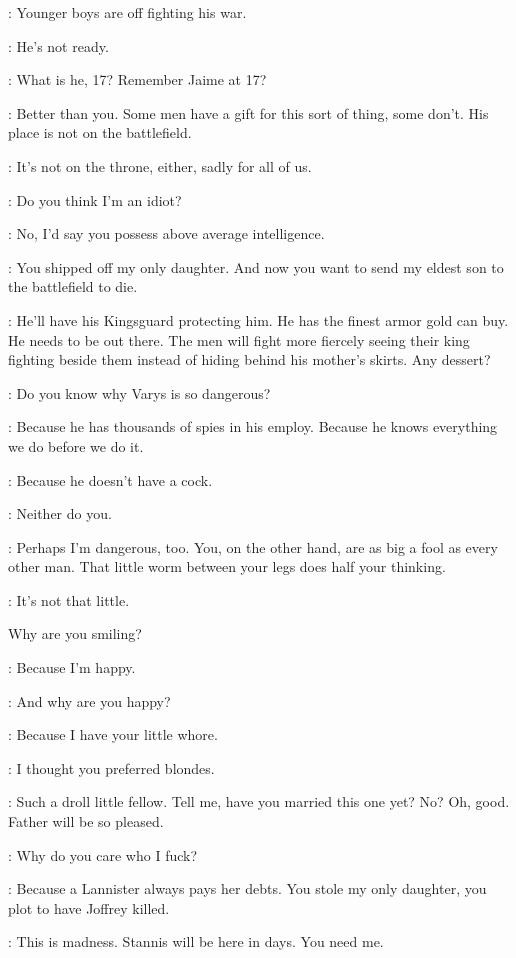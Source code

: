 \TYRION: Younger boys are off fighting his war. 

\CERSEI: He's not ready. 

\TYRION: What is he, 17? Remember Jaime at 17? 

\CERSEI: Better than you. Some men have a gift for this sort of thing, some don't. His place is not on the battlefield. 

\TYRION: It's not on the throne, either, sadly for all of us. 

\CERSEI: Do you think I'm an idiot? 

\TYRION: No, I'd say you possess above average intelligence. 

\CERSEI: You shipped off my only daughter. And now you want to send my eldest son to the battlefield to die. 

\TYRION: He'll have his Kingsguard protecting him. He has the finest armor gold can buy. He needs to be out there. The men will fight more fiercely seeing their king fighting beside them instead of hiding behind his mother's skirts. Any dessert? 

\CERSEI: Do you know why Varys is so dangerous? 

\TYRION: Because he has thousands of spies in his employ. Because he knows everything we do before we do it. 

\CERSEI: Because he doesn't have a cock. 

\TYRION: Neither do you. 

\CERSEI: Perhaps I'm dangerous, too. You, on the other hand, are as big a fool as every other man. That little worm between your legs does half your thinking. 

\TYRION: It's not that little. 

Why are you smiling? 

\CERSEI: Because I'm happy. 

\TYRION: And why are you happy? 

\CERSEI: Because I have your little whore. 

\TYRION: I thought you preferred blondes. 

\CERSEI: Such a droll little fellow. Tell me, have you married this one yet? No? Oh, good. Father will be so pleased. 

\TYRION: Why do you care who I fuck? 

\CERSEI: Because a Lannister always pays her debts. You stole my only daughter, you plot to have Joffrey killed. 

\TYRION: This is madness. Stannis will be here in days. You need me. 

